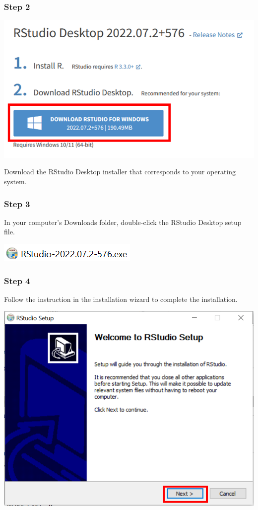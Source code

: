 \documentclass[
  letterpaper,
  DIV=11,
  numbers=noendperiod]{scrreprt}
\begin{document}
\hypertarget{step-2-1}{%
\subsubsection{Step 2}\label{step-2-1}}

\includegraphics{./images/paste-027BCBD8.png}

Download the RStudio Desktop installer that corresponds to your
operating system.

\hypertarget{step-3-1}{%
\subsubsection{Step 3}\label{step-3-1}}

In your computer's Downloads folder, double-click the RStudio Desktop
setup file.

\includegraphics{./images/paste-31A16011.png}

\hypertarget{step-4-1}{%
\subsubsection{Step 4}\label{step-4-1}}

Follow the instruction in the installation wizard to complete the
installation.

\includegraphics{./images/paste-427EA827.png}
\end{document}
